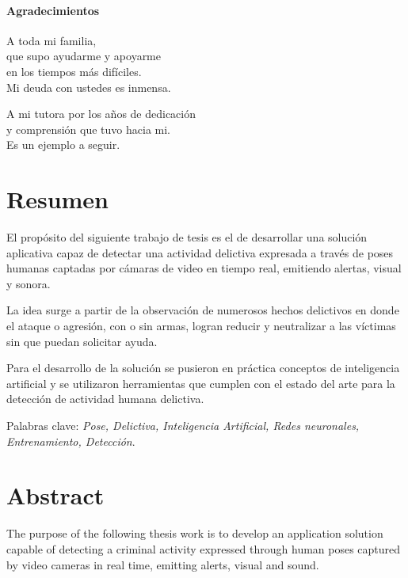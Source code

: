 \documentclass[a4paper,12pt,oneside,spanish]{book}
\begin{document}
\newpage
\begin{flushright}
	\subsubsection{Agradecimientos}
	A toda mi familia, \\
	que supo ayudarme y apoyarme \\
	en los tiempos más difíciles. \\
	Mi deuda con ustedes es inmensa.\par
	
	A mi tutora por los años de dedicación\\
	y comprensión que tuvo hacia mi.\\
	Es un ejemplo a seguir.\\
	
\end{flushright}

\newpage
\tableofcontents

\newpage
\listoffigures

\newpage
\clearpage
\thispagestyle{fancy}
\setlength{\parskip}{1.3em}
\chapter{Resumen}
El propósito del siguiente trabajo de tesis es el de desarrollar una solución aplicativa capaz de detectar una actividad delictiva expresada a través de poses humanas captadas por cámaras de video en tiempo real, emitiendo alertas, visual y sonora. \par 

La idea surge a partir de la observación de numerosos hechos delictivos en donde el ataque o agresión, con o sin armas, logran reducir y neutralizar a las víctimas sin que puedan solicitar ayuda.\par 

Para el desarrollo de la solución se pusieron en práctica conceptos de inteligencia artificial y  se utilizaron herramientas que cumplen con el estado del arte para la detección de actividad humana delictiva.\par 

Palabras clave: \textit{Pose, Delictiva, Inteligencia Artificial, Redes neuronales, Entrenamiento, Detección}.

\newpage
\clearpage
\thispagestyle{fancy}
\setlength{\parskip}{1.3em}
\chapter{Abstract}
The purpose of the following thesis work is to develop an application solution capable of detecting a criminal activity expressed through human poses captured by video cameras in real time, emitting alerts, visual and sound.\par
\end{document}
